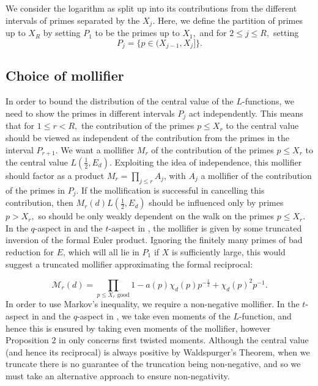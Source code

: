 \documentclass[12pt]{amsart}
\numberwithin{equation}{section}
\numberwithin{thm}{section}
\newcommand{\1}{\mathbf 1}
\begin{document}
We consider the logarithm as split up into its contributions from the different intervals of primes separated by the $X_j$. Here, we define the partition of primes up to $X_R$ by setting $P_1$ to be the primes  up to $X_1,$ and for $2\le j\le R,$ setting \begin{equation}
P_j=\{p\in (X_{j-1},X_j]\}.\end{equation}

\subsection{Choice of mollifier}\label{molchoice}	
In order to bound the distribution of the central value of the $L$-functions, we need to show the  primes in different intervals $P_j$ act independently. This means that for $1\le r<R,$ the contribution of the primes $p\le X_r$ to the central value should be viewed as independent of the contribution from the primes in the interval $P_{r+1}.$ We want a mollifier $M_r$ of the contribution of the primes $p\le X_r$ to the central value $L\left(\frac{1}{2},E_d\right).$ Exploiting the idea of independence, this mollifier should factor as a product $M_r=\prod_{j\le r} A_j$, with $A_j$ a mollifier of the contribution of the primes in $P_j$. If the mollification is successful in cancelling this contribution, then $M_r(d)L\left(\frac{1}{2},E_d\right)$ should be influenced only by primes $p>X_r,$ so should be only weakly dependent on the walk on the primes $p\le X_r$.\\
In the $q$-aspect in \cite{AC25} and the $t$-aspect in \cite{ABR20}, the mollifier is given by some truncated inversion of the formal Euler product. Ignoring the finitely many primes of bad reduction for $E$, which will all lie in $P_1$ if $X$ is sufficiently large, this would suggest a truncated mollifier approximating the formal reciprocal:

\begin{equation}
\mathcal{M}_r(d)=\prod_{p\le X_r \text{  good} } 1-a(p)\chi_d(p)p^{-\frac{1}{2}}+\chi_d(p)^2p^{-1}.\end{equation}
 In order to use Markov's inequality, we require a non-negative mollifier. In the $t$-aspect in \cite{AB} and the $q$-aspect in \cite{AC25}, we take even moments of the $L$-function, and hence this is ensured by taking even moments of the mollifier, however Proposition $2$ in \cite{RS2} only concerns first twisted moments.  Although the central value (and hence its reciprocal) is always positive by Waldspurger's Theorem, when we truncate there is no guarantee of the truncation being non-negative, and so we must take an alternative approach to ensure non-negativity.
\end{document}
